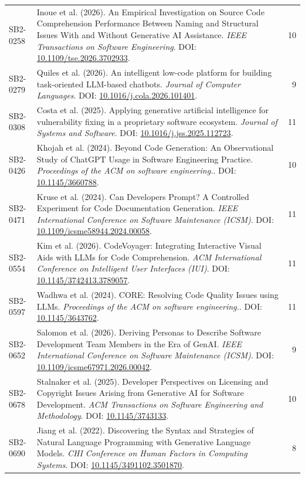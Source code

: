 \begin{small}
\begin{longtable}{lp{11.2cm}r}
SB2-0258 & Inoue et al. (2026). An Empirical Investigation on Source Code Comprehension Performance Between Naming and Structural Issues With and Without Generative AI Assistance. \textit{IEEE Transactions on Software Engineering}. DOI: \url{10.1109/tse.2026.3702933}. & 10 \\
SB2-0279 & Quiles et al. (2026). An intelligent low-code platform for building task-oriented LLM-based chatbots. \textit{Journal of Computer Languages}. DOI: \url{10.1016/j.cola.2026.101401}. & 9 \\
SB2-0308 & Costa et al. (2025). Applying generative artificial intelligence for vulnerability fixing in a proprietary software ecosystem. \textit{Journal of Systems and Software}. DOI: \url{10.1016/j.jss.2025.112723}. & 11 \\
SB2-0426 & Khojah et al. (2024). Beyond Code Generation: An Observational Study of ChatGPT Usage in Software Engineering Practice. \textit{Proceedings of the ACM on software engineering.}. DOI: \url{10.1145/3660788}. & 10 \\
SB2-0471 & Kruse et al. (2024). Can Developers Prompt? A Controlled Experiment for Code Documentation Generation. \textit{IEEE International Conference on Software Maintenance (ICSM)}. DOI: \url{10.1109/icsme58944.2024.00058}. & 11 \\
SB2-0554 & Kim et al. (2026). CodeVoyager: Integrating Interactive Visual Aids with LLMs for Code Comprehension. \textit{ACM International Conference on Intelligent User Interfaces (IUI)}. DOI: \url{10.1145/3742413.3789057}. & 11 \\
SB2-0597 & Wadhwa et al. (2024). CORE: Resolving Code Quality Issues using LLMs. \textit{Proceedings of the ACM on software engineering.}. DOI: \url{10.1145/3643762}. & 11 \\
SB2-0652 & Salomon et al. (2026). Deriving Personas to Describe Software Development Team Members in the Era of GenAI. \textit{IEEE International Conference on Software Maintenance (ICSM)}. DOI: \url{10.1109/icsme67971.2026.00042}. & 9 \\
SB2-0678 & Stalnaker et al. (2025). Developer Perspectives on Licensing and Copyright Issues Arising from Generative AI for Software Development. \textit{ACM Transactions on Software Engineering and Methodology}. DOI: \url{10.1145/3743133}. & 10 \\
SB2-0690 & Jiang et al. (2022). Discovering the Syntax and Strategies of Natural Language Programming with Generative Language Models. \textit{CHI Conference on Human Factors in Computing Systems}. DOI: \url{10.1145/3491102.3501870}. & 8 \\

\end{longtable}
\end{small}
